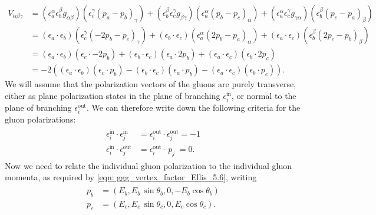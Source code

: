 \documentclass[main.tex]{subfiles}
\begin{document}
\begin{align}\label{eqn: ggg_vertex_factor_Ellis_5.6}
    V_{\alpha\beta\gamma} &= 
    (\epsilon_a^\alpha \epsilon_b^\beta g_{\alpha\beta})(\epsilon_c^\gamma (p_a-p_b)_\gamma) + 
    (\epsilon_b^\beta \epsilon_c^\gamma g_{\beta\gamma})(\epsilon_a^\alpha (p_b-p_c)_\alpha) + 
    (\epsilon_a^\alpha \epsilon_c^\gamma g_{\gamma\alpha})(\epsilon_b^\beta (p_c-p_a)_\beta) \nonumber \\
    &=
    (\epsilon_a \cdot \epsilon_b)(\epsilon_c^\gamma (-2p_b- p_c)_\gamma) + 
    (\epsilon_b \cdot \epsilon_c)(\epsilon_a^\alpha (2p_b -p_a)_\alpha) + 
    (\epsilon_a \cdot \epsilon_c)(\epsilon_b^\beta (2p_c-p_b)_\beta) \nonumber \\
    &= 
    (\epsilon_a \cdot \epsilon_b)(\epsilon_c \cdot -2p_b) + 
    (\epsilon_b \cdot \epsilon_c)(\epsilon_a \cdot 2p_b) +
    (\epsilon_a \cdot \epsilon_c)(\epsilon_b \cdot 2p_c) \nonumber\\
    &= -2\left(
    (\epsilon_a \cdot \epsilon_b)(\epsilon_c \cdot p_b) - 
    (\epsilon_b \cdot \epsilon_c)(\epsilon_a \cdot p_b) -
    (\epsilon_a \cdot \epsilon_c)(\epsilon_b \cdot p_c) 
    \right).
\end{align}
We will assume that the polarization vectors of the gluons are purely transverse, either as plane polarization states in the plane of branching \(\epsilon_i^{\text{in}}\), or normal to the plane of branching \(\epsilon_i^{\text{out}}\). We can therefore write down the following criteria for the gluon polarizations:
\begin{align}\label{eqn: gluon_polarization_criteria_ellis_5.7}
    \begin{split}
    \epsilon_i^{\text{in}} \cdot \epsilon_j^{\text{in}} &= \epsilon_i^{\text{out}} \cdot \epsilon_j^{\text{out}} = -1  \\
    \epsilon_i^{\text{in}} \cdot \epsilon_j^{\text{out}} &= \epsilon_i^{\text{out}} \cdot \, p_j \; = 0.
    \end{split}
\end{align}
Now we need to relate the individual gluon polarization to the individual gluon momenta, as required by \autoref{eqn: ggg_vertex_factor_Ellis_5.6}, writing
\begin{align}\label{eqn: ggg_incoming_gluon_momentum}
    \begin{split}
    p_b &= \left( E_b, E_b \, \sin \theta_b, 0, -E_b \cos \theta_b \right) \\
    p_c &= \left( E_c, E_c \, \sin \theta_c, 0, E_c \cos \theta_c \right).
    \end{split}
\end{align}
\end{document}
